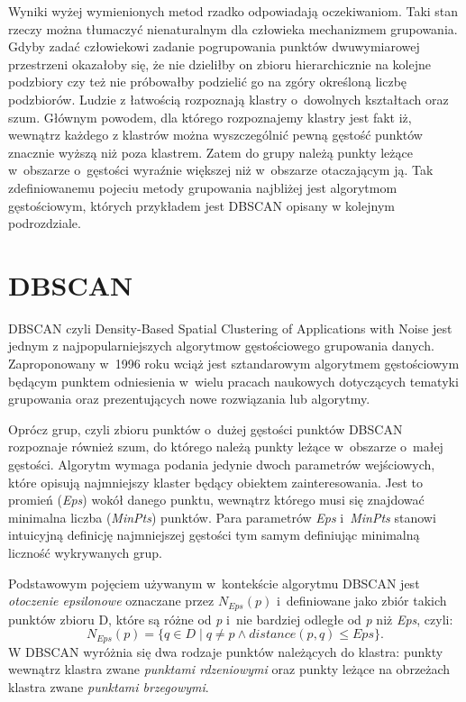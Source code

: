 Wyniki wyżej wymienionych metod rzadko odpowiadają oczekiwaniom. Taki stan rzeczy można tłumaczyć nienaturalnym dla człowieka mechanizmem grupowania. Gdyby zadać człowiekowi zadanie pogrupowania punktów dwuwymiarowej przestrzeni okazałoby się, że nie dzieliłby on zbioru hierarchicznie na kolejne podzbiory czy też nie próbowałby podzielić go na zgóry określoną liczbę podzbiorów. Ludzie z łatwością rozpoznają klastry o~dowolnych kształtach oraz szum. Głównym powodem, dla którego rozpoznajemy klastry jest fakt iż, wewnątrz każdego z klastrów można wyszczególnić pewną gęstość punktów znacznie wyższą niż poza klastrem. Zatem do grupy należą punkty leżące w~obszarze o~gęstości wyraźnie większej niż w~obszarze otaczającym ją. Tak zdefiniowanemu pojeciu metody grupowania najbliżej jest algorytmom gęstościowym, których przykładem jest DBSCAN opisany w kolejnym podrozdziale.

\section[DBSCAN][DBSCAN]{DBSCAN}

DBSCAN czyli Density-Based Spatial Clustering of Applications with Noise jest jednym z najpopularniejszych algorytmow gęstościowego grupowania danych. Zaproponowany w~1996 roku wciąż jest sztandarowym algorytmem gęstościowym będącym punktem odniesienia w~wielu pracach naukowych dotyczących tematyki grupowania oraz prezentujących nowe rozwiązania lub algorytmy.

Oprócz grup, czyli zbioru punktów o~dużej gęstości punktów DBSCAN rozpoznaje również szum, do którego należą punkty leżące w~obszarze o~małej gęstości. Algorytm wymaga podania jedynie dwoch parametrów wejściowych, które opisują najmniejszy klaster będący obiektem zainteresowania. Jest to promień (\emph{Eps}) wokół danego punktu, wewnątrz którego musi się znajdować minimalna liczba (\emph{MinPts}) punktów. Para parametrów \emph{Eps} i~\emph{MinPts} stanowi intuicyjną definicję najmniejszej gęstości tym samym definiując minimalną liczność wykrywanych grup.

Podstawowym pojęciem używanym w~kontekście algorytmu DBSCAN jest \emph{otoczenie epsilonowe} oznaczane przez $N_{Eps}(p)$ i~definiowane jako zbiór takich punktów zbioru D, które są różne od \emph{p} i~nie bardziej odległe od \emph{p} niż \emph{Eps}, czyli:
\begin{displaymath}
N_{Eps} \left( p \right) = \lbrace q \in D \mid q \neq p \wedge distance \left( p,q \right) \leq Eps \rbrace.
\end{displaymath}
W DBSCAN wyróżnia się dwa rodzaje punktów należących do klastra: punkty wewnątrz klastra zwane \emph{punktami rdzeniowymi} oraz punkty leżące na obrzeżach klastra zwane \emph{punktami brzegowymi}. 


